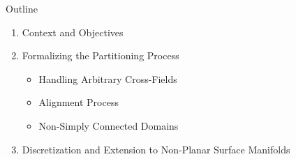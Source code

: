 \documentclass[compress,10pt,aspectratio=169]{beamer}
\begin{document}


\begin{frame}{Outline}
    \vspace{-0.4cm}
    \begin{enumerate}
        \item \color{onera} Context and Objectives \\\vspace{0.26cm}
        \item Formalizing the Partitioning Process %
        \vspace{0.26cm}
        \begin{itemize}
            \item Handling Arbitrary Cross-Fields\\\vspace{0.18cm}
            \item Alignment Process\\\vspace{0.18cm}
            \item Non-Simply Connected Domains\\\vspace{0.18cm}
        \end{itemize}
        \item Discretization and Extension to Non-Planar Surface Manifolds %

\end{enumerate}
\end{frame}
\end{document}
